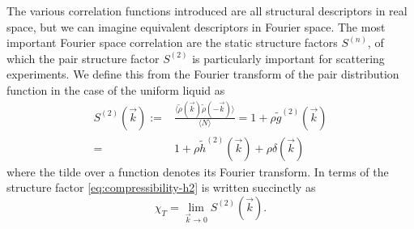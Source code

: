The various correlation functions introduced are all structural descriptors in real space, but we can imagine equivalent descriptors in Fourier space.
The most important Fourier space correlation are the static structure factors $S^{(n)}$, of which the pair structure factor $S^{(2)}$ is particularly important for scattering experiments.
We define this from the Fourier transform of the pair distribution function in the case of the uniform liquid as
\begin{equation}\label{eq:static-structure-factor}
  \begin{split}
    S^{(2)}(\vec{k})
    :=&
    \frac{
      \big\langle \tilde{\rho}(\vec{k}) \tilde{\rho}(-\vec{k}) \big\rangle
    }{
      \langle N \rangle
    }
    =
    1 + \rho \tilde{g}^{(2)}(\vec{k})
    \\ =&
    1 + \rho \tilde{h}^{(2)}(\vec{k}) + \rho \delta(\vec{k})
  \end{split}
\end{equation}
where the tilde over a function denotes its Fourier transform.
In terms of the structure factor \eqref{eq:compressibility-h2} is written succinctly as%
\begin{equation}
  \chi_T = \lim_{\vec{k} \to 0} S^{(2)}(\vec{k}).
\end{equation}




